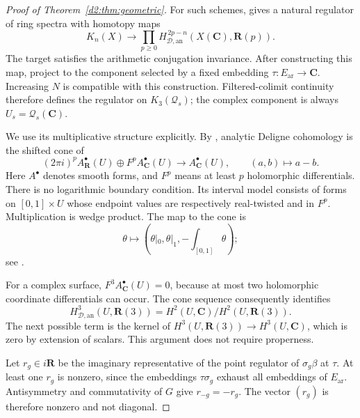 \documentclass[11pt,a4paper]{amsart}
\numberwithin{equation}{section}
\theoremstyle{definition}
\theoremstyle{remark}
\newcommand{\DtwoRR}{\mathbf{R}}
\newcommand{\DtwoCC}{\mathbf{C}}
\newcommand{\DtwocQ}{\mathcal Q}
\newcommand{\Dtwoar}{\mathrm{ar}}
\newcommand{\Dtwoan}{\mathrm{an}}
\begin{document}
\begin{proof}[Proof of Theorem~\ref{d2:thm:geometric}]
For such schemes, \cite[Theorem~2.31 and Remark~2.27]{BunkeTamme}
gives a natural regulator of ring spectra with homotopy maps
\[
 K_n(X)\longrightarrow
 \prod_{p\ge0}H_{\mathcal D,\Dtwoan}^{\,2p-n}
                  (X(\DtwoCC),\DtwoRR(p)).
\]
The target satisfies the arithmetic conjugation invariance.
After constructing this map, project to the component selected by
a fixed embedding \(\tau\colon E_{\Dtwoar}\to\DtwoCC\).
Increasing \(N\) is compatible with this construction.
Filtered-colimit continuity
\cite[IV, Section~6.4]{Weibel} therefore defines the regulator on
\(K_3(\DtwocQ_s)\); the complex component is always
\(U_s=\DtwocQ_s(\DtwoCC)\).

We use its multiplicative structure explicitly.
By \cite[Remark~2.6 and Definition~2.7]{BunkeTamme}, analytic
Deligne cohomology is the shifted cone of
\[
 (2\pi i)^pA_\DtwoRR^\bullet(U)
       \oplus F^pA_\DtwoCC^\bullet(U)
 \longrightarrow A_\DtwoCC^\bullet(U),
 \qquad (a,b)\longmapsto a-b.
\]
Here \(A^\bullet\) denotes smooth forms, and \(F^p\) means at least
\(p\) holomorphic differentials. There is no logarithmic boundary
condition. Its interval model consists of forms on
\([0,1]\times U\) whose endpoint values are respectively real-twisted
and in \(F^p\).
Multiplication is wedge product.
The map to the cone is
\[
 \theta\longmapsto
 \left(\theta|_0,\theta|_1,-\int_{[0,1]}\theta\right);
\]
see \cite[Proposition~2.8 and Corollary~2.14]{BunkeTamme}.

For a complex surface, \(F^3A_\DtwoCC^\bullet(U)=0\), because at most two
holomorphic coordinate differentials can occur.
The cone sequence consequently identifies
\begin{equation}\label{d2:eq:analytic-quotient}
 H_{\mathcal D,\Dtwoan}^{3}(U,\DtwoRR(3))
   =H^2(U,\DtwoCC)/H^2(U,\DtwoRR(3)).
\end{equation}
The next possible term is the kernel of
\(H^3(U,\DtwoRR(3))\to H^3(U,\DtwoCC)\), which is zero by extension of
scalars. This argument does not require properness.

Let \(r_g\in i\DtwoRR\) be the imaginary representative of the point
regulator of \(\sigma_g\beta\) at \(\tau\).
At least one \(r_g\) is nonzero, since the embeddings
\(\tau\sigma_g\) exhaust all embeddings of \(E_{\Dtwoar}\).
Antisymmetry and commutativity of \(G\) give \(r_{-g}=-r_g\).
The vector \((r_g)\) is therefore nonzero and not diagonal.


\end{proof}
\end{document}
